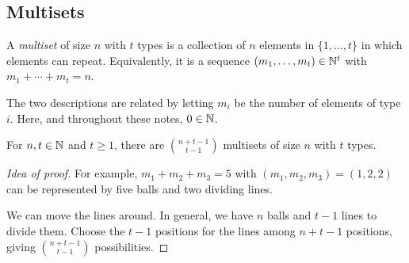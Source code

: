 \subsection{Multisets}
\begin{definition}
A \textit{multiset} of size $n$ with $t$ types is a collection of $n$ elements in $\{1,\ldots,t\}$ in which elements can repeat. Equivalently, it is a sequence $(m_1,\ldots,m_t)\in\mathbb{N}^t$ with $m_1+\cdots+m_t=n$.
\end{definition}
The two descriptions are related by letting $m_i$ be the number of elements of type $i$. Here, and throughout these notes, $0\in\mathbb{N}$.
\begin{theorem}
For $n,t\in\mathbb{N}$ and $t\ge1$, there are $\displaystyle\binom{n+t-1}{t-1}$ multisets of size $n$ with $t$ types.
\end{theorem}
\begin{proof}[Idea of proof]
For example, $m_1+m_2+m_3=5$ with $(m_1,m_2,m_3)=(1,2,2)$ can be represented by five balls and two dividing lines.

We can move the lines around. In general, we have $n$ balls and $t-1$ lines to divide them. Choose the $t-1$ positions for the lines among $n+t-1$ positions, giving $\displaystyle\binom{n+t-1}{t-1}$ possibilities.
\end{proof}

